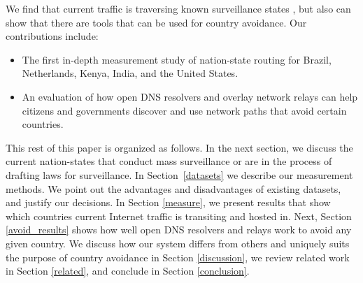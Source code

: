 We find that current traffic is traversing known surveillance states , but also
can show that there are tools that can be used for country avoidance. Our contributions 
include: 

\begin{itemize}
\item The first in-depth measurement study of
  nation-state routing for Brazil, Netherlands, Kenya, India, and the
  United States. 
\item An evaluation of how open DNS resolvers and overlay
  network relays can help citizens and governments discover and use
  network paths that avoid certain countries.
\end{itemize}
\noindent

This rest of this paper is organized as follows.  In the next section, we discuss
the current nation-states that conduct mass surveillance or are in the 
process of drafting laws for surveillance.  In
Section~\ref{datasets} we describe our measurement methods.
We point out the advantages and disadvantages of existing datasets, and
justify our decisions.  In Section \ref{measure}, we present results that show which countries
current Internet traffic is transiting and hosted in.  Next, Section
\ref{avoid_results} shows how well open DNS resolvers and relays work to avoid any
given country.  We discuss how our system differs from others and
uniquely suits the purpose of country avoidance in Section
\ref{discussion}, we review related work in Section \ref{related}, and
conclude in Section \ref{conclusion}. 
